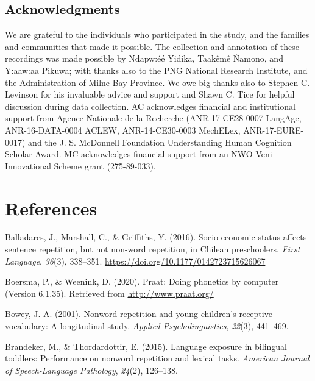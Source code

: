 \documentclass[english,,man,floatsintext]{apa6}
\begin{document}
\newpage

\hypertarget{acknowledgments}{%
\subsection{Acknowledgments}\label{acknowledgments}}

We are grateful to the individuals who participated in the study, and the families and communities that made it possible. The collection and annotation of these recordings was made possible by Ndapw:éé Yidika, Taakêmê Ńamono, and Y:aaw:aa Pikuwa; with thanks also to the PNG National Research Institute, and the Administration of Milne Bay Province. We owe big thanks also to Stephen C. Levinson for his invaluable advice and support and Shawn C. Tice for helpful discussion during data collection. AC acknowledges financial and institutional support from Agence Nationale de la Recherche (ANR-17-CE28-0007 LangAge, ANR-16-DATA-0004 ACLEW, ANR-14-CE30-0003 MechELex, ANR-17-EURE-0017) and the J. S. McDonnell Foundation Understanding Human Cognition Scholar Award. MC acknowledges financial support from an NWO Veni Innovational Scheme grant (275-89-033).

\hypertarget{references}{%
\section{References}\label{references}}

\setlength{\parindent}{-0.5in}
\setlength{\leftskip}{0.5in}

\hypertarget{refs}{}
\leavevmode\hypertarget{ref-balladares2016socio}{}%
Balladares, J., Marshall, C., \& Griffiths, Y. (2016). Socio-economic status affects sentence repetition, but not non-word repetition, in Chilean preschoolers. \emph{First Language}, \emph{36}(3), 338--351. \url{https://doi.org/10.1177/0142723715626067}

\leavevmode\hypertarget{ref-Praat}{}%
Boersma, P., \& Weenink, D. (2020). Praat: Doing phonetics by computer (Version 6.1.35). Retrieved from \url{http://www.praat.org/}

\leavevmode\hypertarget{ref-bowey2001nonword}{}%
Bowey, J. A. (2001). Nonword repetition and young children's receptive vocabulary: A longitudinal study. \emph{Applied Psycholinguistics}, \emph{22}(3), 441--469.

\leavevmode\hypertarget{ref-brandeker2015language}{}%
Brandeker, M., \& Thordardottir, E. (2015). Language exposure in bilingual toddlers: Performance on nonword repetition and lexical tasks. \emph{American Journal of Speech-Language Pathology}, \emph{24}(2), 126--138.
\end{document}
